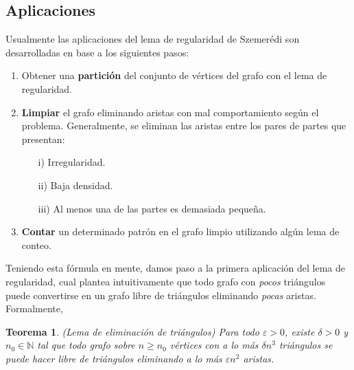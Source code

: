 \documentclass{article}[14pts]
\newtheorem{teorema}{Teorema}
\let\varepsilon=\varepsilon
\begin{document}
\subsection{Aplicaciones}

Usualmente las aplicaciones del lema de regularidad de Szemerédi son desarrolladas en base a los siguientes pasos:
\begin{enumerate}
    \item Obtener una \textbf{partición} del conjunto de vértices del grafo con el lema de regularidad.
    \item \textbf{Limpiar} el grafo eliminando aristas con mal comportamiento según el problema. Generalmente, se eliminan las aristas entre los pares de partes que presentan:
    \begin{itemize}
        \item[i)] Irregularidad.
        \item[ii)] Baja densidad.
        \item[iii)] Al menos una de las partes es demasiada pequeña.
    \end{itemize}
    \item \label{paso3_reg} \textbf{Contar} un determinado patrón en el grafo limpio utilizando algún lema de conteo.
\end{enumerate}\medskip

Teniendo esta fórmula en mente, damos paso a la primera aplicación del lema de regularidad, cual plantea intuitivamente que todo grafo con \emph{pocos} triángulos puede convertirse en un grafo libre de triángulos eliminando \emph{pocas} aristas. Formalmente, \medskip

\begin{teorema} \label{Enunciado TRL} (Lema de eliminación de triángulos)
    Para todo $\varepsilon > 0$, existe $\delta > 0$ y $n_0\in \mathbb{N}$ tal que todo grafo sobre $n\geq n_0$ vértices con a lo más $\delta n^{3}$ triángulos se puede hacer libre de triángulos eliminando a lo más $\varepsilon n^{2}$ aristas.
\end{teorema}
\end{document}
